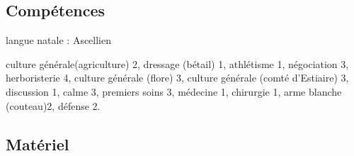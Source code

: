 \documentclass[10pt,a4paper]{article}
\begin{document}
\subsection{Compétences}
langue natale : Ascellien

culture générale(agriculture) 2, dressage (bétail) 1, athlétisme 1, négociation 3, herboristerie 4, culture générale (flore) 3, culture générale (comté d'Estiaire) 3, discussion 1, calme 3, premiers soins 3, médecine 1, chirurgie 1, arme blanche (couteau)2, défense 2.
\subsection{Matériel}
\end{document}
